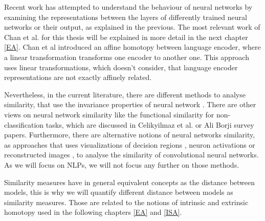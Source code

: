 


Recent work \cite{csiszarik_similarity_nodate, kornblith_similarity_2019, li_convergent_2016, morcos2018insightsrepresentationalsimilarityneural} has attempted to understand the behaviour of neural networks by examining the representations between the layers of differently trained neural networks or their output, as explained in the previous.
The most relevant work of Chan et al. \cite{chan_affine_2024} for this thesis will be explained in more detail in the next chapter \ref{EA}.
Chan et al \cite{chan_affine_2024} introduced an affine homotopy between language encoder, where a linear transformation transforms one encoder to another one. 
This approach uses linear transformations, which doesn't consider, that language encoder representations are not exactly affinely related.


Nevertheless, in the current literature, there are different methods to analyse similarity, that use the invariance properties of neural network \cite{ding_grounding_2021, kornblith_similarity_2019}.
There are other views on neural network similarity like the functional similarity for non-classification tasks,  which are discussed in  Celikyilmaz et al. \cite{celikyilmaz2021evaluationtextgenerationsurvey} or Ali Borji \cite{ borji2018prosconsganevaluation} survey papers.
Furthermore, there are alternative notions of neural networks similarity, as approaches that uses visualizations of decision regions \cite{somepalli2022neuralnetslearnmodel}, neuron activations \cite{bau2017networkdissectionquantifyinginterpretability} or reconstructed images \cite{mahendran2014understandingdeepimagerepresentations}, to analyse the similarity of convolutional neural networks.
As we will focus on \ac{NLP}s, we will not focus any further on those methods.

Similarity measures have in general equivalent concepts as the distance between models, this is why we will quantify different distance between models as similarity measures.
Those are related to the notions of intrinsic and extrinsic homotopy used in the following chapters \ref{EA} and \ref{ISA}.

